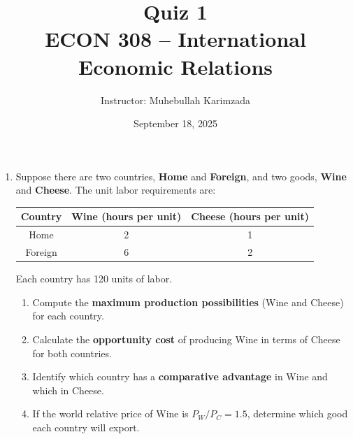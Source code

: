 \documentclass[12pt]{article}
\title{Quiz 1\\ \vspace{8pt} \Large ECON 308 -- International Economic Relations}
\author{Instructor: Muhebullah Karimzada}
\date{September 18, 2025}
\begin{document}
\maketitle


\begin{enumerate}


\item Suppose there are two countries, \textbf{Home} and \textbf{Foreign}, and two goods, \textbf{Wine} and \textbf{Cheese}. 
The unit labor requirements are:

\begin{center}
\begin{tabular}{|c|c|c|}
\hline
Country & Wine (hours per unit) & Cheese (hours per unit) \\
\hline
Home & 2 & 1 \\
Foreign & 6 & 2 \\
\hline
\end{tabular}
\end{center}

Each country has 120 units of labor.

\begin{enumerate}[label=(\alph*)]
    \item Compute the \textbf{maximum production possibilities} (Wine and Cheese) for each country. 
    \item Calculate the \textbf{opportunity cost} of producing Wine in terms of Cheese for both countries. 
    \item Identify which country has a \textbf{comparative advantage} in Wine and which in Cheese. 
    \item If the world relative price of Wine is $P_W/P_C = 1.5$, determine which good each country will export.
\end{enumerate}

\bigskip

\end{enumerate}
\end{document}
